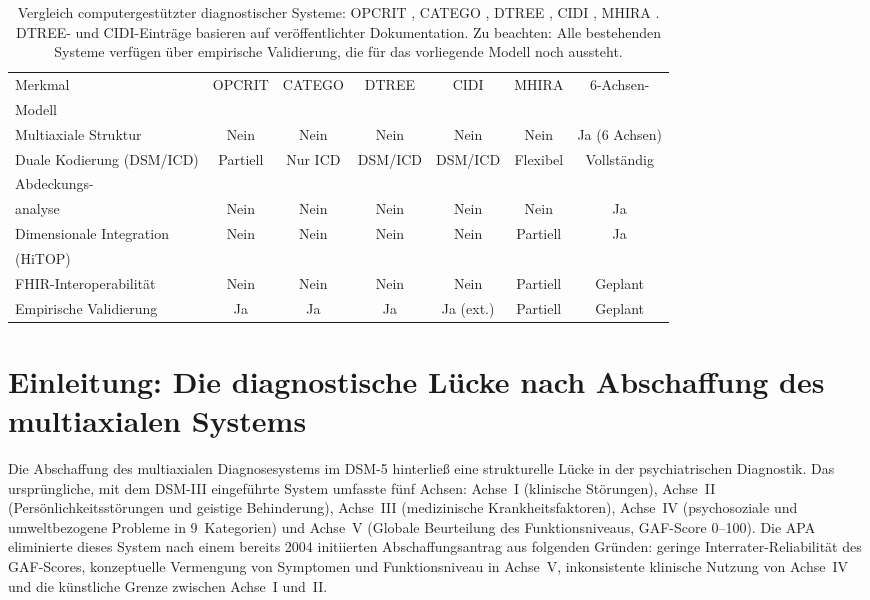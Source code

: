 \documentclass[11pt,a4paper]{article}
\begin{document}
\begin{table}[ht]
\centering
\caption{Vergleich computergest\"utzter diagnostischer Systeme: OPCRIT \citep{McGuffin1991}, CATEGO \citep{Wing1974}, DTREE \citep{First1993}, CIDI \citep{Kessler2004}, MHIRA \citep{Stasiak2023}. DTREE- und CIDI-Eintr\"age basieren auf ver\"offentlichter Dokumentation. Zu beachten: Alle bestehenden Systeme verf\"ugen \"uber empirische Validierung, die f\"ur das vorliegende Modell noch aussteht.}
\scriptsize
\setlength{\tabcolsep}{2pt}
\begin{tabularx}{\textwidth}{@{}Y *{6}{C}@{}}
\toprule
Merkmal & OPCRIT & CATEGO & DTREE & CIDI & MHIRA & 6-Achsen-\\Modell \\
\midrule
Multiaxiale Struktur & Nein & Nein & Nein & Nein & Nein & Ja (6 Achsen) \\
Duale Kodierung (DSM/ICD) & Partiell & Nur ICD & DSM/ICD & DSM/ICD & Flexibel & Voll\-st\"andig \\
Abdeckungs-\\analyse & Nein & Nein & Nein & Nein & Nein & Ja \\
Dimensionale Integration & Nein & Nein & Nein & Nein & Partiell & Ja\\(HiTOP) \\
FHIR-Interoperabi\-lit\"at & Nein & Nein & Nein & Nein & Partiell & Geplant \\
Empirische Validierung & Ja & Ja & Ja & Ja (ext.) & Partiell & Geplant \\
\bottomrule
\end{tabularx}
\setlength{\tabcolsep}{6pt}
\normalsize
\label{tab:vergleich}
\end{table}

\newpage


\section{Einleitung: Die diagnostische L\"ucke nach Abschaffung des multiaxialen Systems}
\label{sec:einleitung}

Die Abschaffung des multiaxialen Diagnosesystems im DSM-5 \citep{APA2013} hinterlie\ss{} eine strukturelle L\"ucke in der psychiatrischen Diagnostik. Das urspr\"ungliche, mit dem DSM-III \citep{APA1980DSM3} eingef\"uhrte System umfasste f\"unf Achsen: Achse~I (klinische St\"orungen), Achse~II (Pers\"onlichkeitsst\"orungen und geistige Behinderung), Achse~III (medizinische Krankheitsfaktoren), Achse~IV (psychosoziale und umweltbezogene Probleme in 9~Kategorien) und Achse~V (Globale Beurteilung des Funktionsniveaus, GAF-Score 0--100). Die APA eliminierte dieses System nach einem bereits 2004 initiierten Abschaffungsantrag aus folgenden Gr\"unden: geringe Interrater-Reliabilit\"at des GAF-Scores, konzeptuelle Vermengung von Symptomen und Funktionsniveau in Achse~V, inkonsistente klinische Nutzung von Achse~IV und die k\"unstliche Grenze zwischen Achse~I und~II.
\end{document}
